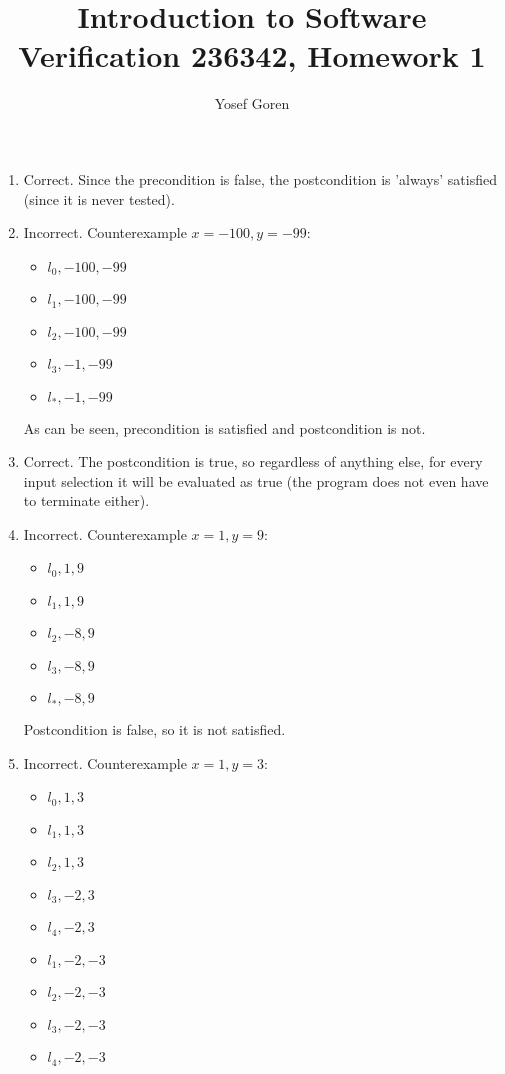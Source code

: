 \documentclass{article}
\begin{document}
\author{Yosef Goren}
\title{Introduction to Software Verification 236342, Homework 1}
\maketitle
\section{}
\begin{enumerate}[label=\Alph*.]
    \item Correct. Since the precondition is false, the postcondition is 'always' satisfied (since it is never tested).
    \item Incorrect. Counterexample $x=-100,y=-99$:
    \begin{itemize}
        \item $l_0, -100, -99$
        \item $l_1, -100, -99$
        \item $l_2, -100, -99$
        \item $l_3, -1, -99$
        \item $l_*, -1, -99$
    \end{itemize}
    As can be seen, precondition is satisfied and postcondition is not.
    \item Correct. The postcondition is true, so regardless of anything else,
    for every input selection it will be evaluated as true (the program does not even have to terminate either).
    \item Incorrect. Counterexample $x=1, y=9$:
    \begin{itemize}
        \item $l_0, 1, 9$
        \item $l_1, 1, 9$
        \item $l_2, -8, 9$
        \item $l_3, -8, 9$
        \item $l_*, -8, 9$
    \end{itemize}
    Postcondition is false, so it is not satisfied.
    \item Incorrect. Counterexample $x=1, y=3$:
    \begin{itemize}
        \item $l_0, 1, 3$
        \item $l_1, 1, 3$
        \item $l_2, 1, 3$
        \item $l_3, -2, 3$
        \item $l_4, -2, 3$
        \item $l_1, -2, -3$
        \item $l_2, -2, -3$
        \item $l_3, -2, -3$
        \item $l_4, -2, -3$

    \end{itemize}
\end{enumerate}
\end{document}
